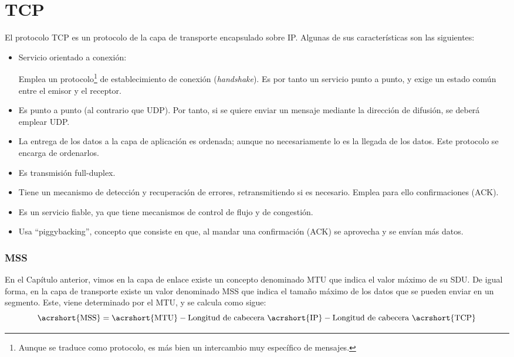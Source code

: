 \section{\acrfull{TCP}}
El protocolo \acrshort{TCP} es un protocolo de la capa de transporte encapsulado sobre \acrshort{IP}. Algunas de sus características son las siguientes:
\begin{itemize}
    \item Servicio orientado a conexión:
    
    Emplea un protocolo\footnote{Aunque se traduce como protocolo, es más bien un intercambio muy específico de mensajes.} de establecimiento de conexión (\textit{handshake}). Es por tanto un servicio punto a punto, y exige un estado común entre el emisor y el receptor. 
    
    \item Es punto a punto (al contrario que \acrshort{UDP}). Por tanto, si se quiere enviar un mensaje mediante la dirección de difusión, se deberá emplear \acrshort{UDP}.
    
    \item La entrega de los datos a la capa de aplicación es ordenada; aunque no necesariamente lo es la llegada de los datos. Este protocolo se encarga de ordenarlos.
    \item Es transmisión full-duplex.
    \item Tiene un mecanismo de detección y recuperación de errores, retransmitiendo si es necesario. Emplea para ello confirmaciones (\acrshort{ACK}).
    \item Es un servicio fiable, ya que tiene mecanismos de control de flujo y de congestión.
    \item Usa ``piggybacking'', concepto que consiste en que, al mandar una confirmación (\acrshort{ACK}) se aprovecha y se envían más datos.
\end{itemize}


\subsubsection{\acrfull{MSS}}

En el Capítulo anterior, vimos en la capa de enlace existe un concepto denominado \acrshort{MTU} que indica el valor máximo de su \acrshort{SDU}. De igual forma, en la capa de transporte existe un valor denominado \acrshort{MSS} que indica el tamaño máximo de los datos que se pueden enviar en un segmento. Este, viene determinado por el \acrshort{MTU}, y se calcula como sigue:
\begin{equation*}
    \text{\acrshort{MSS}} = \text{\acrshort{MTU}} - \text{Longitud de cabecera \acrshort{IP}} - \text{Longitud de cabecera \acrshort{TCP}}
\end{equation*}

